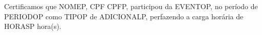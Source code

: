 Certificamos que NOMEP, CPF CPFP, participou da EVENTOP, no período de PERIODOP como TIPOP de ADICIONALP, perfazendo a carga horária de HORASP hora(s).
